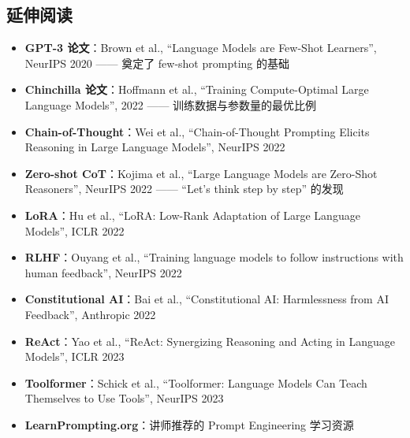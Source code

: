 \documentclass[a4paper]{article}
\begin{document}
\subsection{延伸阅读}

\begin{itemize}
    \item \textbf{GPT-3 论文}：Brown et al., ``Language Models are Few-Shot Learners'', NeurIPS 2020 —— 奠定了 few-shot prompting 的基础
    \item \textbf{Chinchilla 论文}：Hoffmann et al., ``Training Compute-Optimal Large Language Models'', 2022 —— 训练数据与参数量的最优比例
    \item \textbf{Chain-of-Thought}：Wei et al., ``Chain-of-Thought Prompting Elicits Reasoning in Large Language Models'', NeurIPS 2022
    \item \textbf{Zero-shot CoT}：Kojima et al., ``Large Language Models are Zero-Shot Reasoners'', NeurIPS 2022 —— ``Let's think step by step'' 的发现
    \item \textbf{LoRA}：Hu et al., ``LoRA: Low-Rank Adaptation of Large Language Models'', ICLR 2022
    \item \textbf{RLHF}：Ouyang et al., ``Training language models to follow instructions with human feedback'', NeurIPS 2022
    \item \textbf{Constitutional AI}：Bai et al., ``Constitutional AI: Harmlessness from AI Feedback'', Anthropic 2022
    \item \textbf{ReAct}：Yao et al., ``ReAct: Synergizing Reasoning and Acting in Language Models'', ICLR 2023
    \item \textbf{Toolformer}：Schick et al., ``Toolformer: Language Models Can Teach Themselves to Use Tools'', NeurIPS 2023
    \item \textbf{LearnPrompting.org}：讲师推荐的 Prompt Engineering 学习资源
\end{itemize}

\end{document}
